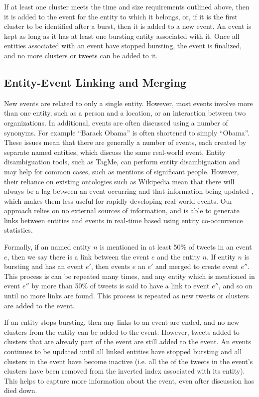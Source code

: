 If at least one cluster meets the time and size requirements outlined above, then it is added to the event for the entity to which it belongs, or, if it is the first cluster to be identified after a burst, then it is added to a new event.
An event is kept as long as it has at least one bursting entity associated with it.
Once all entities associated with an event have stopped bursting, the event is finalized, and no more clusters or tweets can be added to it.

\subsection{Entity-Event Linking and Merging}
\label{detection:sec:entityLinking}
New events are related to only a single entity.
However, most events involve more than one entity, such as a person and a location, or an interaction between two organizations.
In additional, events are often discussed using a number of synonyms.
For example ``Barack Obama'' is often shortened to simply ``Obama''.
These issues mean that there are generally a number of events, each created by separate named entities, which discuss the same real-world event.
Entity disambiguation tools, such as TagMe, can perform entity disambiguation and may help for common cases, such as mentions of significant people.
However, their reliance on existing ontologies such as Wikipedia mean that there will always be a lag between an event occurring and that information being updated \citep{WRN2012:osbornebieber}, which makes them less useful for rapidly developing real-world events.
Our approach relies on no external sources of information, and is able to generate links between entities and events in real-time based using entity co-occurrence statistics.

Formally, if an named entity $n$ is mentioned in at least 50\% of tweets in an event $e$, then we say there is a link between the event $e$ and the entity $n$.
If entity $n$ is bursting and has an event $e'$, then events $e$ an $e'$ and merged to create event $e''$.
This process is can be repeated many times, and any entity which is mentioned in event $e''$ by more than 50\% of tweets is said to have a link to event $e''$, and so on until no more links are found.
This process is repeated as new tweets or clusters are added to the event.

If an entity stops bursting, then any links to an event are ended, and no new clusters from the entity can be added to the event.
However, tweets added to clusters that are already part of the event are still added to the event.
An events continues to be updated until all linked entities have stopped bursting and all clusters in the event have become inactive (i.e. all the of the tweets in the event's clusters have been removed from the inverted index associated with its entity).
This helps to capture more information about the event, even after discussion has died down.

